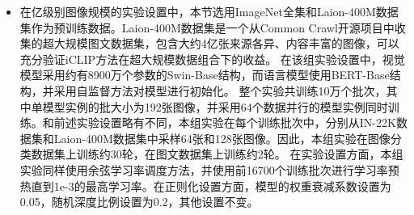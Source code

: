\begin{itemize}
    \item 在亿级别图像规模的实验设置中，本节选用ImageNet全集和Laion-400M数据集\cite{schuhmann2021laion400m}作为预训练数据。Laion-400M数据集是一个从Common Crawl开源项目\cite{cc}中收集的超大规模图文数据集，包含大约4亿张来源各异、内容丰富的图像，可以充分验证iCLIP方法在超大规模数据组合下的收益。
    在该组实验设置中，视觉模型采用约有8900万个参数的Swin-Base\cite{Swin}结构，而语言模型使用BERT-Base结构，并采用自监督方法对模型进行初始化。
    整个实验共训练10万个批次，其中单模型实例的批大小为192张图像，并采用64个数据并行的模型实例同时训练。和前述实验设置略有不同，本组实验在每个训练批次中，分别从IN-22K数据集和Laion-400M数据集中采样64张和128张图像。因此，本组实验在图像分类数据集上训练约30轮，在图文数据集上训练约2轮。
    在实验设置方面，本组实验同样使用余弦学习率调度方法，并使用前16700个训练批次进行学习率预热直到1e-3的最高学习率。在正则化设置方面，模型的权重衰减系数设置为0.05，随机深度比例设置为0.2，其他设置不变。
\end{itemize}

